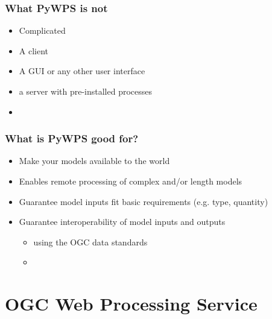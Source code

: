 \documentclass{beamer}
\begin{document}
\begin{frame}
\frametitle{What PyWPS is not}

\begin{itemize}
  \item Complicated
  \item A client
  \item A GUI or any other user interface
  \item a server with pre-installed processes
  \item 
  
\end{itemize}
\end{frame}



\begin{frame}
\frametitle{What is PyWPS good for?}

\begin{itemize}
  \item Make your models available to the world
  \item Enables remote processing of complex and/or length models 
  \item Guarantee model inputs fit basic requirements (e.g. type, quantity)
  \item Guarantee interoperability of model inputs and outputs
  \begin{itemize}
    \item using the OGC data standards
	\item 
  \end{itemize}
\end{itemize}
\end{frame}


\section{OGC Web Processing Service}
\end{document}
